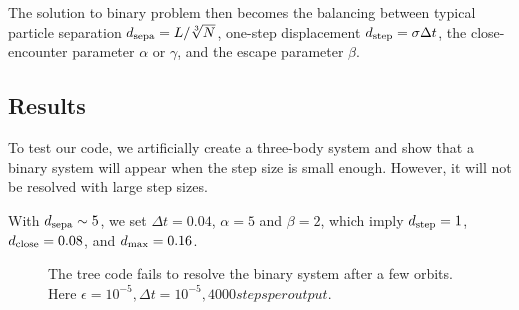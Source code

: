The solution to binary problem then becomes the balancing between typical particle 
separation $ d_{\rm sepa} = L/\sqrt[3]{N} $, one-step displacement $ d_{\rm 
step} = \sigma \Delta t $, the close-encounter parameter $ \alpha $ or $ \gamma $, and 
the escape parameter $ \beta $.

\subsection*{Results}
To test our code, we artificially create a three-body system and show that a binary system 
will appear when the step size is small enough. However, it will not be resolved with large 
step 
sizes.

With $ d_{\rm sepa} \sim 5 $, we set $ \Delta t = 0.04 $, $ \alpha = 5 $ and $ \beta = 2 $, 
which imply $ d_{\rm step} = 1 $, $ d_{\rm close} = 0.08 $, and $ d_{\rm max} = 0.16 $.

\begin{figure}
	\centering
	\caption{The tree code fails to resolve the binary system after a few orbits. Here $ 
	\epsilon = 10^{-5}, \Delta t = 10^{-5}, 4000 steps per output. $}
\end{figure}



